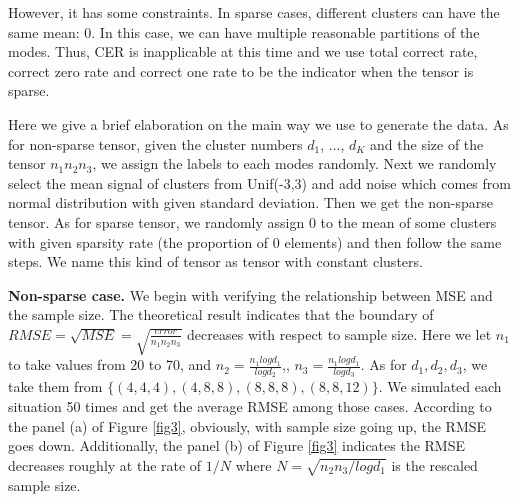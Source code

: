 \documentclass{article}
\begin{document}
However, it has some constraints. In sparse cases, different clusters can have the same mean: 0. In this case, we can have multiple reasonable partitions of the modes. Thus, CER is inapplicable at this time and we use  total correct rate, correct zero rate and correct one rate to be the indicator when the tensor is sparse. 
\par


Here we give a brief elaboration on the main way we use to generate the data. As for non-sparse tensor, given the cluster numbers $d_1$, ..., $d_K$ and the size of the tensor $n_1n_2n_3$, we assign the labels to each modes randomly. Next we randomly select the mean signal of clusters from Unif(-3,3) and add noise which comes from normal distribution with given standard deviation. Then we get the non-sparse tensor. As for sparse tensor, we randomly assign 0 to the mean of some  clusters with given sparsity rate (the proportion of 0 elements) and then follow the same steps. We name this kind of tensor as tensor with constant clusters.\par 

\textbf{Non-sparse case.} We begin with verifying the relationship between MSE and the sample size. The theoretical result indicates that the boundary of $RMSE=\sqrt{MSE}= \sqrt{\frac{error}{n_1n_2n_3}}$ decreases with respect to sample size. Here we let $n_1$ to take values from 20 to 70, and $n_2=\frac{n_1logd_1}{logd_2}$,, $n_3 = \frac{n_1logd_1}{logd_3}$. As for $d_1, d_2, d_3$, we take them from $\{(4,4,4),(4,8,8),(8,8,8),(8,8,12)\}$. We simulated each situation 50 times and get the average RMSE among those cases. According to the panel (a) of Figure \ref{fig3}, obviously, with sample size going up, the RMSE goes down. Additionally, the panel (b) of Figure \ref{fig3} indicates the RMSE decreases roughly at the rate of $1/N$ where $N=\sqrt{n_2n_3/logd_1}$ is the rescaled sample size.\par 
\end{document}
